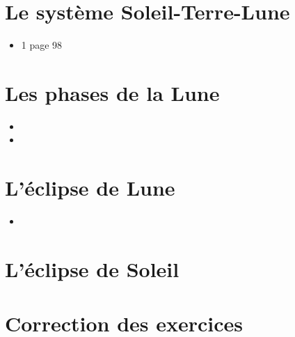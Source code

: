 \documentclass[12pt,a4paper]{article}
\date{}
\title{}
\begin{document}
	
	

\section{Le système Soleil-Terre-Lune}










\begin{myexos}
	\begin{itemize}
		\item 1 page 98
	\end{itemize}
\end{myexos}

\section{Les phases de la Lune}





\begin{myexos}
	\begin{multicols}{2}
	
		\begin{itemize}
			\item {}
			\item {}
		\end{itemize}
	
	\end{multicols}
\end{myexos}


\section{L'éclipse de Lune}





\begin{myexos}
	\begin{itemize}
		\item {}
	\end{itemize}
\end{myexos}


\section{L'éclipse de Soleil}








\begin{myexos}
\end{myexos}
\appendix

\newpage

\section*{Correction des exercices}
\end{document}
